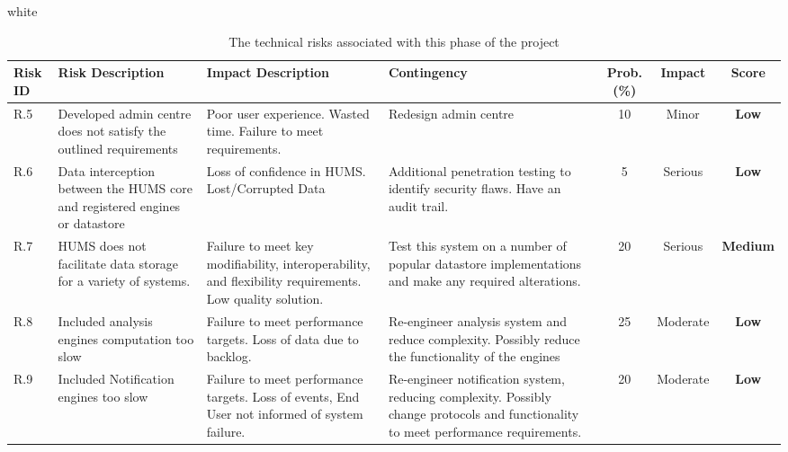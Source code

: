 \documentclass[10pt,a4paper]{article}
\newcommand{\tableformat}[4]{
\begin{table}[H]
\centering
  \rowcolors{2}{gray!10} {white}
\begin{tabular}{#1}
  \hline
  \rowcolor[gray]{0.9} #2
\end{tabular}
\caption{#3}
\label{#4}
\end{table}}
\begin{document}
\tableformat{p{0.8cm} p{3cm} p{3cm} p{3cm} c c c}
{ 	\hline
  	Risk ID & Risk Description & Impact Description & Contingency & Prob.(\%) & Impact & Score \\
  	\hline
  
 	R.5 & Developed admin centre does not satisfy the outlined requirements & Poor user experience. Wasted time. Failure to meet requirements. & Redesign admin centre & 10 & Minor & \textbf{Low} \\
   	R.6 & Data interception between the HUMS core and registered engines or datastore & Loss of confidence in HUMS. Lost/Corrupted Data & Additional penetration testing to identify security flaws. Have an audit trail. & 5 & Serious &  \textbf{Low} \\
   	R.7 & HUMS does not facilitate data storage for a variety of systems. & Failure to meet key modifiability, interoperability, and flexibility requirements. Low quality solution. &  Test this system on a number of popular datastore implementations and make any required alterations. & 20 & Serious & \textbf{Medium} \\
   	R.8 & Included analysis engines computation too slow & Failure to meet performance targets. Loss of data due to backlog. & Re-engineer analysis system and reduce complexity. Possibly reduce the functionality of the engines & 25 & Moderate & \textbf{Low} \\	
	R.9 & Included Notification engines too slow & Failure to meet performance targets. Loss of events, End User not informed of system failure. & Re-engineer notification system, reducing complexity. Possibly change protocols and functionality to meet performance requirements. & 20 & Moderate & \textbf{Low} \\	
  	\hline
}
{The technical risks associated with this phase of the project}{tab:tech_risks}
\end{document}
